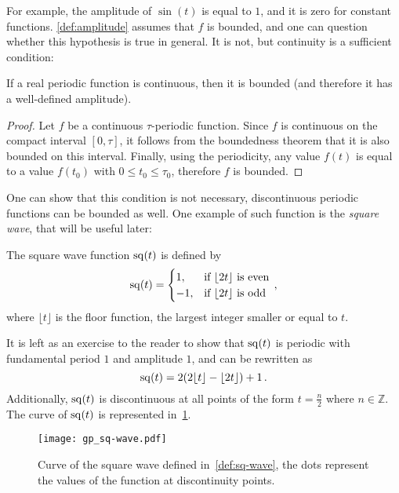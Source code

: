\noindent For example, the amplitude of $\sin(t)$ is equal to $1$, and it is zero for
constant functions. \cref{def:amplitude} assumes that $f$ is bounded, and one can question
whether this hypothesis is true in general. It is not, but continuity is a sufficient
condition:
\begin{proposition}
  If a real periodic function is continuous, then it is bounded (and therefore it has a
  well-defined amplitude).
\end{proposition}
\begin{proof}
  Let $f$ be a continuous $\tau$-periodic function. Since $f$ is continuous on the compact
  interval $[0,\tau]$, it follows from the boundedness theorem that it is also bounded on
  this interval. Finally, using the periodicity, any value $f(t)$ is equal to a value
  $f(t_0)$ with $0\leq t_0\leq \tau_0$, therefore $f$ is bounded.
\end{proof}
\noindent One can show that this condition is not necessary, \ie discontinuous periodic
functions can be bounded as well. One example of such function is the \emph{square wave},
that will be useful later:
\begin{definition}
  \label{def:sq-wave}
  The square wave function $\operatorname{sq}(t)$ is defined by
  \begin{equation}
    \operatorname{sq}(t)=
    \begin{cases}
      1, &\text{if~}\lfloor 2t\rfloor~\text{is even}\\
      -1, &\text{if~}\lfloor 2t\rfloor~\text{is odd}\\
    \end{cases}\,,
    \label{eq:wave-square}
  \end{equation}
  where $\lfloor t\rfloor$ is the floor function, \ie the largest integer smaller or equal
  to $t$.
\end{definition}
\noindent It is left as an exercise to the reader to show that $\operatorname{sq}(t)$ is periodic with
fundamental period $1$ and amplitude $1$, and can be rewritten as
\begin{equation}
  \operatorname{sq}(t)=2(2\lfloor t\rfloor-\lfloor 2t\rfloor)+1\,.
\end{equation}
Additionally, $\operatorname{sq}(t)$ is discontinuous at all points of the form $t=\frac{n}{2}$ where
$n\in\mathbb{Z}$. The curve of $\operatorname{sq}(t)$ is represented in~\cref{fig:sq-wave}.
\begin{figure}[t]
  \centering
  \texttt{[image: gp\_sq-wave.pdf]}
  \caption{Curve of the square wave defined in~\cref{def:sq-wave}, the dots represent the
  values of the function at discontinuity points.}
  \label{fig:sq-wave}
\end{figure}

